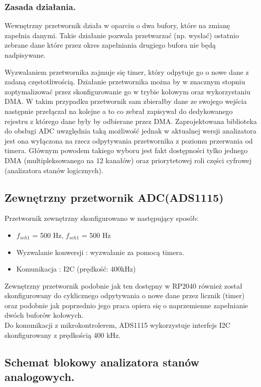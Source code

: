 \subsubsection{Zasada działania.}
    Wewnętrzny przetwornik działa w oparciu o dwa bufory, które na zmianę zapełnia danymi. Takie 
    działanie pozwala przetwarzać (np. wysłać) ostatnio zebrane dane które przez okres 
    zapełniania drugiego bufora nie będą nadpisywane.

    Wyzwalaniem przetwornika zajmuje się timer, który odpytuje go o nowe dane z zadaną częstotliwością.
    Działanie przetwornika można by w znacznym stopniu zoptymalizować przez skonfigurowanie go w trybie kołowym oraz wykorzystaniu DMA. 
    W takim przypadku przetwornik sam zbierałby dane ze swojego wejścia następnie przełączał na kolejne a to co zebrał zapisywał do dedykowanego rejestru z którego dane były by odbierane przez DMA.
    Zaprojektowana biblioteka do obsługi ADC uwzględnia taką możliwość jednak w aktualnej wersji analizatora jest ona wyłączona na rzecz odpytywania przetwornika z poziomu przerwania od timera. 
    Głównym powodem takiego wyboru jest fakt dostępności tylko jednego DMA (multipleksowanego na 12 kanałów) oraz priorytetowej roli części cyfrowej (analizatora stanów logicznych).


\subsection{Zewnętrzny przetwornik ADC(ADS1115)}
Przetwornik zewnętrzny skonfigurowano w następujący sposób:
\begin{itemize}
    \item $f_{sch1}$ = 500 Hz, $f_{sch1}$ = 500 Hz
    \item Wyzwalanie konwersji : wyzwalanie za pomocą timera. 
    \item Komunikacja : I2C (prędkość: 400kHz)
\end{itemize}

Zewnętrzny przetwornik podobnie jak ten dostępny w RP2040 również został skonfigurowany do cyklicznego odpytywania
o nowe dane przez licznik (timer) oraz podobnie jak poprzednio jego praca opiera się o naprzemienne zapełnianie dwóch buforów kołowych. \\
Do komunikacji z mikrokontrolerem, ADS1115 wykorzystuje interfejs I2C skonfigurowany z prędkością 400 kHz.

\subsection{Schemat blokowy analizatora stanów analogowych.}

